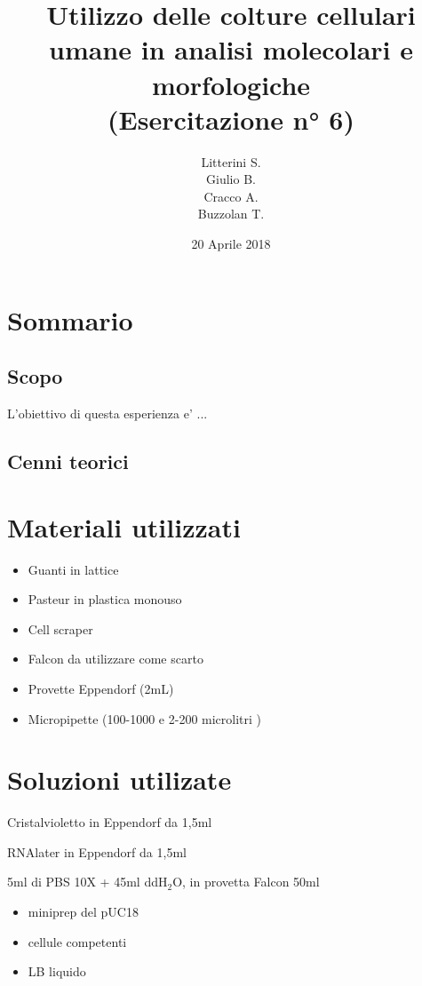 \documentclass{article}
\title{Utilizzo delle colture cellulari umane in analisi molecolari e morfologiche \\ (Esercitazione n° 6)} %
\author{Litterini S. \\Giulio B. \\Cracco A.\\Buzzolan T. } %
\date{20 Aprile 2018} %
\begin{document}
\maketitle


\section{Sommario}

\subsection{Scopo}

L'obiettivo di questa esperienza e' ...


\subsection{Cenni teorici}

\section{Materiali utilizzati}

\begin{itemize}
\item Guanti in lattice
\item Pasteur in plastica monouso
\item Cell scraper
\item Falcon da utilizzare come scarto
\item Provette Eppendorf (2mL)
\item Micropipette (100-1000  e 2-200 microlitri  )
\end{itemize}


\section{Soluzioni utilizate}
\item Cristalvioletto in Eppendorf da 1,5ml
\item RNAlater in Eppendorf da 1,5ml
\item 5ml di PBS 10X + 45ml ddH$_2$O, in provetta Falcon 50ml

\begin{itemize}

\item miniprep del pUC18
\item cellule competenti
\item LB liquido

\end{itemize}
\end{document}
